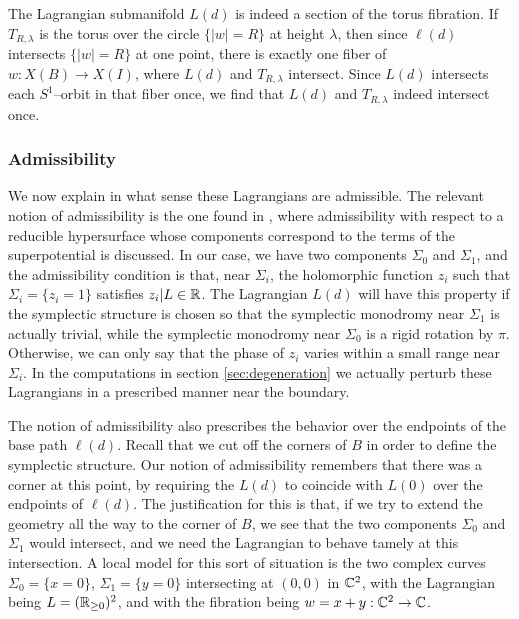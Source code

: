 \documentclass[12pt]{amsart}
\begin{document}
The Lagrangian submanifold $L(d)$ is indeed a section of the torus
fibration. If $T_{R,\lambda}$ is the torus over the circle $\{|w| = R\}$
at height $\lambda$, then since $\ell(d)$ intersects $\{|w| = R\}$ at
one point, there is exactly one fiber of $w:X(B)\to X(I)$, where
$L(d)$ and $T_{R,\lambda}$ intersect. Since $L(d)$ intersects each
$S^1$--orbit in that fiber once, we find that $L(d)$ and
$T_{R,\lambda}$ indeed intersect once.




\subsubsection{Admissibility}
\label{sec:admissibility}

We now explain in what sense these Lagrangians are admissible. The
relevant notion of admissibility is the one found in \cite[\S
7.2]{auroux07}, where admissibility with respect to a reducible
hypersurface whose components correspond to the terms of the
superpotential is discussed. In our case, we have two components
$\Sigma_0$ and $\Sigma_1$, and the admissibility condition is that,
near $\Sigma_i$, the holomorphic function $z_i$ such that $\Sigma_i =
\{z_i = 1\}$ satisfies $z_i|L \in \mathbb{R}$. The Lagrangian $L(d)$ will have
this property if the symplectic structure is chosen so that the
symplectic monodromy near $\Sigma_1$ is actually trivial, while the
symplectic monodromy near $\Sigma_0$ is a rigid rotation by
$\pi$. Otherwise, we can only say that the phase of $z_i$ varies
within a small range near $\Sigma_i$. In the computations in section
\ref{sec:degeneration} we actually perturb these Lagrangians in a
prescribed manner near the boundary.

The notion of admissibility also prescribes the behavior over the
endpoints of the base path $\ell(d)$. Recall that we cut off the
corners of $B$ in order to define the symplectic structure. Our notion
of admissibility remembers that there was a corner at this point, by
requiring the $L(d)$ to coincide with $L(0)$ over the endpoints of
$\ell(d)$. The justification for this is that, if we try to extend the
geometry all the way to the corner of $B$, we see that the two
components $\Sigma_0$ and $\Sigma_1$ would intersect, and we need the
Lagrangian to behave tamely at this intersection. A local model for
this sort of situation is the two complex curves $\Sigma_0 = \{x=0\}$,
$\Sigma_1 = \{y= 0\}$ intersecting at $(0,0)$ in $\mathbb{C}^2$, with the
Lagrangian being $L = (\mathbb{R}_{\geq 0})^2$, and with the fibration being
$w = x+y : \mathbb{C}^2 \to \mathbb{C}$.
\end{document}
